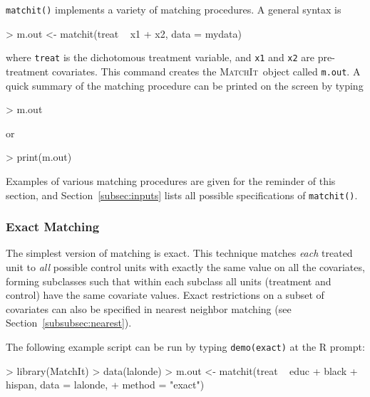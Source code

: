\documentclass[oneside,letterpaper,titlepage]{article}
\newcommand{\MatchIt}{\textsc{MatchIt}}
\begin{document}
\texttt{matchit()} implements a variety of matching procedures.  A
general syntax is
\begin{Schunk}
\begin{Sinput}
> m.out <- matchit(treat ~ x1 + x2, data = mydata)
\end{Sinput}
\end{Schunk}
where {\tt treat} is the dichotomous treatment variable, and {\tt x1}
and {\tt x2} are pre-treatment covariates.  This command creates the
\MatchIt\ object called \texttt{m.out}.  A quick summary of the
matching procedure can be printed on the screen by typing
\begin{Schunk}
\begin{Sinput}
> m.out
\end{Sinput}
\end{Schunk}
or
\begin{Schunk}
\begin{Sinput}
> print(m.out)
\end{Sinput}
\end{Schunk}
Examples of various matching procedures are given for the reminder of
this section, and Section~\ref{subsec:inputs} lists all possible
specifications of {\tt matchit()}.

\subsubsection{Exact Matching}
\label{subsubsec:exact}

The simplest version of matching is exact.  This technique matches
\emph{each} treated unit to \emph{all} possible control units with
exactly the same value on all the covariates, forming subclasses such
that within each subclass all units (treatment and control) have the
same covariate values.  Exact restrictions on a subset of covariates
can also be specified in nearest neighbor matching (see
Section~\ref{subsubsec:nearest}).

The following example script can be run by typing {\tt demo(exact)} at
the R prompt:
\begin{Schunk}
\begin{Sinput}
> library(MatchIt)
> data(lalonde)
> m.out <- matchit(treat ~ educ + black + hispan, data = lalonde, 
+     method = "exact")
\end{Sinput}
\end{Schunk}
\end{document}
